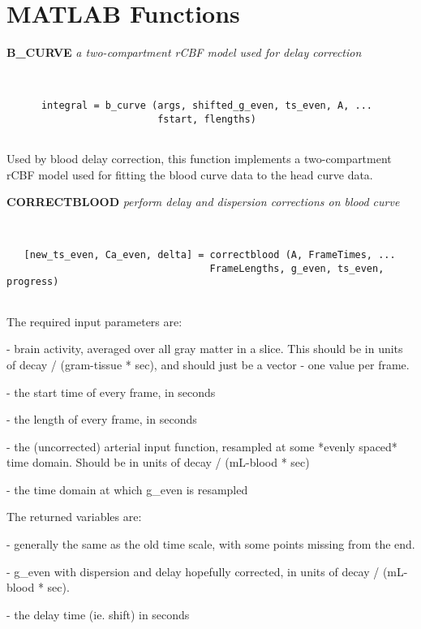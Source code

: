\section{MATLAB Functions}

{\large\bf B\_CURVE} {\em a two-compartment rCBF model used for delay
correction}
\begin{verbatim}


      integral = b_curve (args, shifted_g_even, ts_even, A, ... 
                          fstart, flengths)


\end{verbatim}

  Used by blood delay correction, this function implements a
  two-compartment rCBF model used for fitting the blood
  curve data to the head curve data.
\newpage


{\large\bf CORRECTBLOOD} {\em  perform delay and dispersion corrections on blood curve}
\begin{verbatim}


   [new_ts_even, Ca_even, delta] = correctblood (A, FrameTimes, ...
                                   FrameLengths, g_even, ts_even, progress)


\end{verbatim}

   The required input parameters are: 
\begin{description}
\item {} - brain activity, averaged over all gray matter in a slice.  This
           should be in units of decay / (gram-tissue * sec), and should
           just be a vector - one value per frame.
\item {} - the start time of every frame, in seconds
\item {} - the length of every frame, in seconds
\item {} - the (uncorrected) arterial input function, resampled at
                some *evenly spaced* time domain.  Should be in units
                of decay / (mL-blood * sec)
\item {} - the time domain at which g\_even is resampled
\end{description}
 
   The returned variables are:
\begin{description}
\item {} - generally the same as the old time scale,
                     with some points missing from the end.
\item {} - g\_even with dispersion and delay hopefully corrected,
                 in units of decay / (mL-blood * sec).  
\item {} - the delay time (ie. shift) in seconds
\end{description}
 
